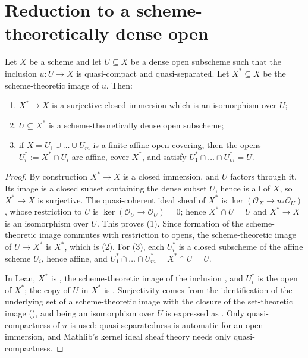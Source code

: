 \section{Reduction to a scheme-theoretically dense open}\label{sec:chow-dense}

\begin{lemma}
\label{lem:chow-scheme-theoretic-closure}
\leanok
Let $X$ be a scheme and let $U\subseteq X$ be a dense open subscheme such that
the inclusion $u\colon U\to X$ is quasi-compact and quasi-separated.  Let
$X^{*}\subseteq X$ be the scheme-theoretic image of $u$.  Then:
\begin{enumerate}
  \item $X^{*}\to X$ is a surjective closed immersion which is an isomorphism
  over $U$;
  \item $U\subseteq X^{*}$ is a scheme-theoretically dense open subscheme;
  \item if $X=U_1\cup\dots\cup U_m$ is a finite affine open covering, then the
  opens $U_i^{*}:=X^{*}\cap U_i$ are affine, cover $X^{*}$, and satisfy
  $U_1^{*}\cap\dots\cap U_m^{*}=U$.
\end{enumerate}
\end{lemma}
\begin{proof}
\leanok
By construction $X^{*}\to X$ is a closed immersion, and $U$ factors through it.
Its image is a closed subset containing the dense subset $U$, hence is all of
$X$, so $X^{*}\to X$ is surjective.  The quasi-coherent ideal sheaf of $X^{*}$
is $\ker(\mathcal O_X\to u_*\mathcal O_U)$, whose restriction to $U$ is
$\ker(\mathcal O_U\to\mathcal O_U)=0$; hence $X^{*}\cap U=U$ and $X^{*}\to X$
is an isomorphism over $U$.  This proves (1).  Since formation of the
scheme-theoretic image commutes with restriction to opens, the
scheme-theoretic image of $U\to X^{*}$ is $X^{*}$, which is (2).  For (3), each
$U_i^{*}$ is a closed subscheme of the affine scheme $U_i$, hence affine, and
$U_1^{*}\cap\dots\cap U_m^{*}=X^{*}\cap U=U$.

In Lean, $X^{*}$ is \texttt{}, the scheme-theoretic image of the
inclusion \texttt{}, and $U_i^{*}$ is the open
\texttt{} of $X^{*}$; the copy of $U$ in $X^{*}$ is
\texttt{}.  Surjectivity comes from the identification of the
underlying set of a scheme-theoretic image with the closure of the set-theoretic image
(\texttt{}), and being an isomorphism
over $U$ is expressed as \texttt{}.  Only
quasi-compactness of $u$ is used: quasi-separatedness is automatic for an open immersion, and
Mathlib's kernel ideal sheaf theory needs only quasi-compactness.
\end{proof}

